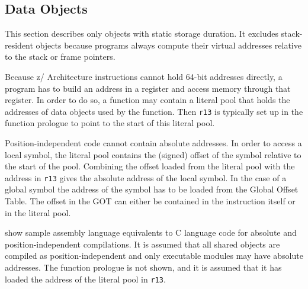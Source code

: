 \documentclass[english,11pt,twoside,toc=bib,toc=idx]{scrreprt}
\newcommand{\ADDRBITS}{64}
\newcommand{\ARCH}{z/\kern-1pt Ar\-chi\-tec\-ture}
\newcommand{\ADDRBITS}{31}
\newcommand{\ARCH}{ESA/390}
\begin{document}
\subsection{Data Objects}
This section describes only objects with static storage duration.  It
excludes stack-resident objects because programs always compute their
virtual addresses relative to the stack or frame pointers.

Because \ARCH{} instructions cannot hold \ADDRBITS{}-bit addresses
directly, a program has to build an address in a register and access
memory through that register.  In order to do so, a function may contain a
literal pool that holds the addresses of data objects used by the
function.  Then \texttt{r13} is typically set up in the function prologue
to point to the start of this literal pool.

Position-independent code cannot contain absolute addresses.  In order
to access a local symbol, the literal pool contains the (signed) offset
of the symbol relative to the start of the pool.  Combining the offset
loaded from the literal pool with the address in \texttt{r13} gives the
absolute address of the local symbol.  In the case of a global symbol
the address of the symbol has to be loaded from the Global Offset
Table.  The offset in the GOT can either be contained in the
instruction itself or in the literal pool.

 show sample assembly
language equivalents to C language code for absolute and
position-independent compilations.  It is assumed that all shared
objects are compiled as position-independent and only executable
modules may have absolute addresses.  The
function prologue is not shown, and it is assumed that it has loaded the
address of the literal pool in \texttt{r13}.
\end{document}
